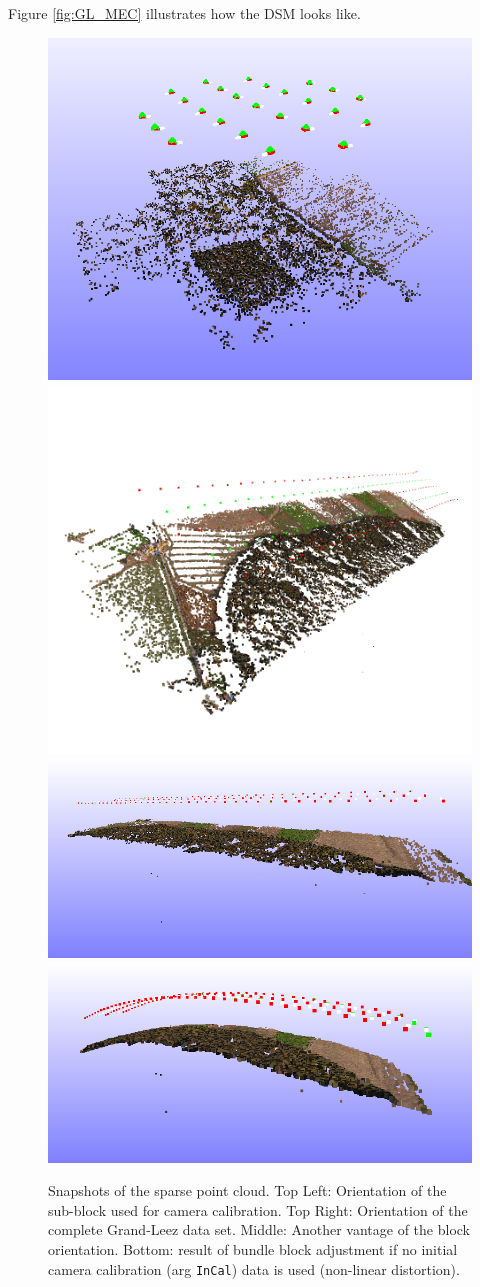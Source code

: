 Figure \ref{fig:GL_MEC} illustrates how the DSM looks like.


\begin{figure}
\centering
\includegraphics[width=0.45\linewidth]{FIGS/UASGrandLeez/Sample4calib.png}
\includegraphics[width=0.45\linewidth]{FIGS/UASGrandLeez/GLori.png}
\includegraphics[width=0.8\linewidth]{FIGS/UASGrandLeez/OriGL-precal.png}
\includegraphics[width=0.8\linewidth]{FIGS/UASGrandLeez/OriGL-autocal.png}
\caption{Snapshots of the sparse point cloud. Top Left: Orientation of the sub-block used for camera calibration. Top Right: Orientation of the complete Grand-Leez data set. Middle: Another vantage of the block orientation. Bottom: result of bundle block adjustment if no initial camera calibration (arg {\tt InCal}) data is used (non-linear distortion).}
\label{fig:GLori}
\end{figure}

